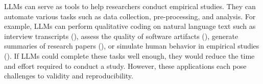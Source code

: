 LLMs can serve as tools to help researchers conduct empirical studies.
They can automate various tasks such as data collection, pre-processing, and analysis.
For example, LLMs can perform qualitative coding on natural language text such as interview transcripts (\annotators), assess the quality of software artifacts (\judges), generate summaries of research papers (\synthesis), or simulate human behavior in empirical studies (\subjects). If LLMs could complete these tasks well enough, they would reduce the time and effort required to conduct a study. However, these applications each pose challenges to validity and reproducibility.
